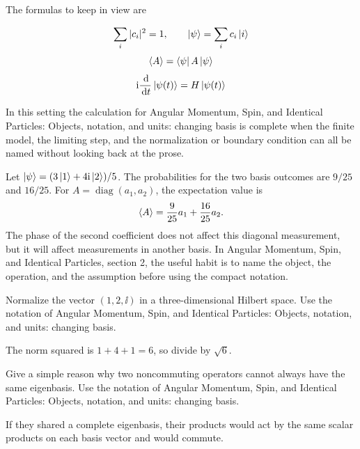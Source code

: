 The formulas to keep in view are

\[
  \sum_i |c_i|^2=1,\qquad \left|\psi\right\rangle=\sum_i c_i\left|i\right\rangle
\]
\[
  \left\langle A\right\rangle=\left\langle \psi\right|A\left|\psi\right\rangle
\]
\[
  \mathrm i\frac{\,\mathrm d}{\,\mathrm d t}\left|\psi(t)\right\rangle=H\left|\psi(t)\right\rangle
\]

In this setting the calculation for Angular Momentum, Spin, and Identical Particles: Objects, notation, and units: changing basis is complete when the finite model, the limiting step, and the normalization or boundary condition can all be named without looking back at the prose.




\begin{example}
Let \(\left|\psi\right\rangle=(3\left|1\right\rangle+4\mathrm i\left|2\right\rangle)/5\).  The probabilities for the two basis outcomes are \(9/25\) and \(16/25\).  For \(A=\operatorname{diag}(a_1,a_2)\), the expectation value is
\[
  \left\langle A\right\rangle=\frac{9}{25}a_1+\frac{16}{25}a_2.
\]
The phase of the second coefficient does not affect this diagonal measurement, but it will affect measurements in another basis.  In Angular Momentum, Spin, and Identical Particles, section 2, the useful habit is to name the object, the operation, and the assumption before using the compact notation.
\end{example}



\begin{exercise}
Normalize the vector \((1,2,\ii)\) in a three-dimensional Hilbert space.  Use the notation of Angular Momentum, Spin, and Identical Particles: Objects, notation, and units: changing basis.
\begin{answer}
The norm squared is \(1+4+1=6\), so divide by \(\sqrt6\).
\end{answer}
\end{exercise}

\begin{exercise}
Give a simple reason why two noncommuting operators cannot always have the same eigenbasis.  Use the notation of Angular Momentum, Spin, and Identical Particles: Objects, notation, and units: changing basis.
\begin{answer}
If they shared a complete eigenbasis, their products would act by the same scalar products on each basis vector and would commute.
\end{answer}
\end{exercise}




